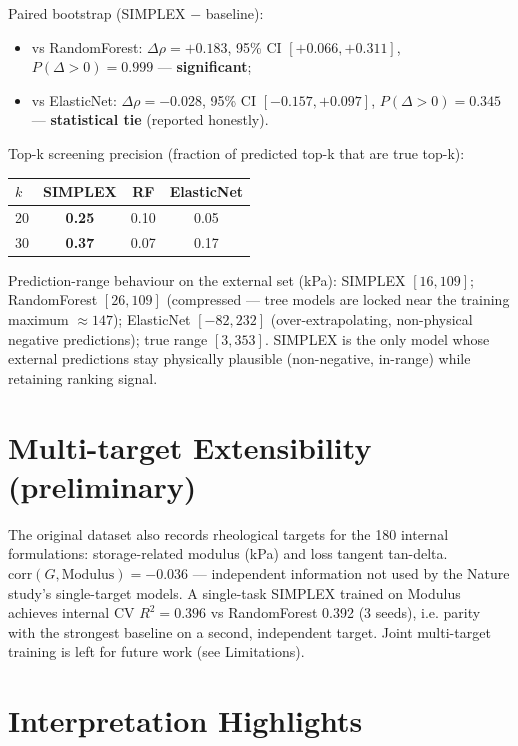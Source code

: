 \documentclass[utf8]{frontiers_suppmat}
\begin{document}
Paired bootstrap (SIMPLEX $-$ baseline):
\begin{itemize}
\item vs RandomForest: $\Delta\rho = +0.183$, 95\% CI $[+0.066, +0.311]$,
  $P(\Delta>0) = 0.999$ --- \textbf{significant};
\item vs ElasticNet: $\Delta\rho = -0.028$, 95\% CI $[-0.157, +0.097]$,
  $P(\Delta>0) = 0.345$ --- \textbf{statistical tie} (reported honestly).
\end{itemize}

Top-k screening precision (fraction of predicted top-k that are true top-k):

\begin{table}[h]
\centering
\begin{tabular}{lccc}
\toprule
$k$ & SIMPLEX & RF & ElasticNet \\
\midrule
20 & \textbf{0.25} & 0.10 & 0.05 \\
30 & \textbf{0.37} & 0.07 & 0.17 \\
\bottomrule
\end{tabular}
\end{table}

Prediction-range behaviour on the external set (kPa): SIMPLEX $[16, 109]$;
RandomForest $[26, 109]$ (compressed --- tree models are locked near the
training maximum $\approx 147$); ElasticNet $[-82, 232]$ (over-extrapolating,
non-physical negative predictions); true range $[3, 353]$. SIMPLEX is the
only model whose external predictions stay physically plausible
(non-negative, in-range) while retaining ranking signal.

\section{Multi-target Extensibility (preliminary)}

The original dataset also records rheological targets for the 180 internal
formulations: storage-related modulus (kPa) and loss tangent tan-delta.
$\mathrm{corr}(G, \mathrm{Modulus}) = -0.036$ --- independent information not
used by the Nature study's single-target models. A single-task SIMPLEX
trained on Modulus achieves internal CV $R^2 = 0.396$ vs RandomForest 0.392
(3 seeds), i.e. parity with the strongest baseline on a second, independent
target. Joint multi-target training is left for future work (see
Limitations).

\section{Interpretation Highlights}
\end{document}
